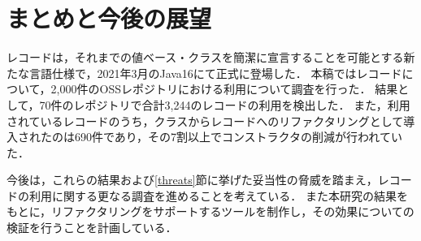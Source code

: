 \section{まとめと今後の展望\label{conclusion}}

レコードは，それまでの値ベース・クラスを簡潔に宣言することを可能とする新たな言語仕様で，2021年3月のJava16にて正式に登場した．
本稿ではレコードについて，2,000件のOSSレポジトリにおける利用について調査を行った．
結果として，70件のレポジトリで合計3,244のレコードの利用を検出した．
また，利用されているレコードのうち，クラスからレコードへのリファクタリングとして導入されたのは690件であり，その7割以上でコンストラクタの削減が行われていた．

今後は，これらの結果および\ref{threats}節に挙げた妥当性の脅威を踏まえ，レコードの利用に関する更なる調査を進めることを考えている．
また本研究の結果をもとに，リファクタリングをサポートするツールを制作し，その効果についての検証を行うことを計画している．
